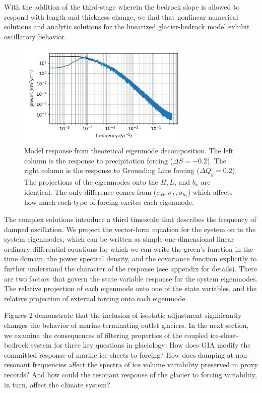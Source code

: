 \documentclass[tc, manuscript]{copernicus}
\begin{document}
With the addition of the third-stage wherein the bedrock slope is allowed to respond with length and thickness change, we find that nonlinear numerical solutions and analytic solutions for the linearized glacier-bedrock model exhibit oscillatory behavior. 


\begin{figure}[t]
\includegraphics[width=8.3cm]{../figures/simulationSMB03.png}
\caption{Model response from theoretical eigenmode decomposition.
The left column is the response to precipitation forcing ($\Delta S = −0.2$). 
The right column is the response to Grounding Line forcing ($\Delta Q_g = 0.2$).
The projections of the eigenmodes onto the $H, L$, and $b_x$ are identical. The only difference comes from ($\sigma_H, \sigma_L, \sigma_{b_x}$) which affects how much each type of forcing excites each eigenmode.}
\end{figure}


The complex solutions introduce a third timescale that describes the frequency of damped oscillation. We project the vector-form equation for the system on to the system eigenmodes, which can be written as simple one-dimensional linear ordinary differential equations for which we can write the green's function in the time domain, the power spectral density, and the covariance function explicitly to further understand the character of the response (see appendix for details). There are two factors that govern the state variable response for the system eigenmodes. The relative projection of each eigenmode onto one of the state variables, and the relative projection of external forcing onto each eigenmode.


Figures 2 demonstrate that the inclusion of isostatic adjustment significantly changes the behavior of marine-terminating outlet glaciers. 
In the next section, we examine the consequences of filtering properties of the coupled ice-sheet-bedrock system for three key questions in glaciology: 
How does GIA modify the committed response of marine ice-sheets to forcing?
How does damping at non-resonant frequencies affect the spectra of ice volume variability preserved in proxy records?
And how could the resonant response of the glacier to forcing variability, in turn, affect the climate system?
\end{document}
